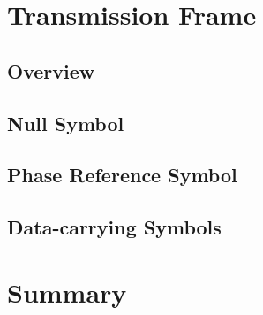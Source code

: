 \documentclass[class=report,11pt,crop=false]{standalone}
\begin{document}
\section{Transmission Frame}


\subsection{Overview}


\subsection{Null Symbol}


\subsection{Phase Reference Symbol}


\subsection{Data-carrying Symbols}



\section{Summary}


\ifstandalone

\printnoidxglossary[type=\acronymtype,nonumberlist]
\fi
\end{document}
